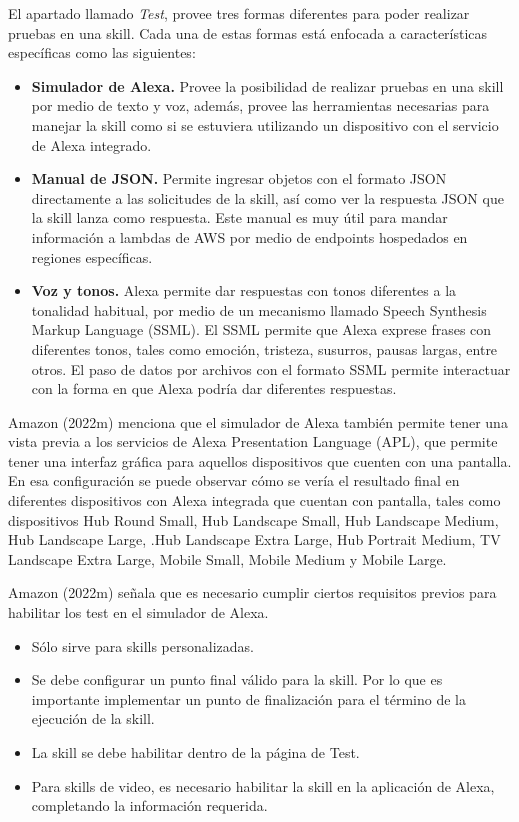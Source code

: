 El apartado llamado \textit{Test}, provee tres formas diferentes para poder realizar pruebas en una skill. Cada una de estas formas está enfocada a características específicas como las siguientes:

\begin{itemize}
  \item \textbf{Simulador de Alexa.} Provee la posibilidad de realizar pruebas en una skill por medio de texto y voz, además, provee las herramientas necesarias para manejar la skill como si se estuviera utilizando un dispositivo con el servicio de Alexa integrado.
  \item \textbf{Manual de JSON.} Permite ingresar objetos con el formato JSON directamente a las solicitudes de la skill, así como ver la respuesta JSON que la skill lanza como respuesta. Este manual es muy útil para mandar información a lambdas de AWS por medio de endpoints hospedados en regiones específicas.
  \item \textbf{Voz y tonos.} Alexa permite dar respuestas con tonos diferentes a la tonalidad habitual, por medio de un mecanismo llamado Speech Synthesis Markup Language (SSML). El SSML permite que Alexa exprese frases con diferentes tonos, tales como emoción, tristeza, susurros, pausas largas, entre otros. El paso de datos por archivos con el formato SSML permite interactuar con la forma en que Alexa podría dar diferentes respuestas.
\end{itemize}

Amazon (2022m) menciona que el simulador de Alexa también permite tener una vista previa a los servicios de Alexa Presentation Language (APL), que permite tener una interfaz gráfica para aquellos dispositivos que cuenten con una pantalla. En esa configuración se puede observar cómo se vería el resultado final en diferentes dispositivos con Alexa integrada que cuentan con pantalla, tales como dispositivos Hub Round Small, Hub Landscape Small, Hub Landscape Medium, Hub Landscape Large, .Hub Landscape Extra Large, Hub Portrait Medium, TV Landscape Extra Large, Mobile Small, Mobile Medium y Mobile Large.

Amazon (2022m) señala que es necesario cumplir ciertos requisitos previos para habilitar los test en el simulador de Alexa.

\begin{itemize}
  \item Sólo sirve para skills personalizadas.
  \item Se debe configurar un punto final válido para la skill. Por lo que es importante implementar un punto de finalización para el término de la ejecución de la skill.
  \item La skill se debe habilitar dentro de la página de Test.
  \item Para skills de video, es necesario habilitar la skill en la aplicación de Alexa, completando la información requerida.
\end{itemize}

